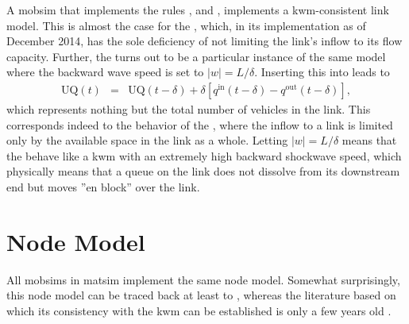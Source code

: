 A \gls{mobsim} that implements the rules , 
and ,  implements a \gls{kwm}-consistent
link model. This is almost the case for the ,
which, in its implementation as of December 2014, has the sole deficiency
of not limiting the link's inflow to its flow capacity. 
Further, the  turns out to be a
particular instance of the same model where the backward wave speed
is set to $\left|w\right|=L/\delta$. Inserting this into 
leads to
\begin{eqnarray}
\text{UQ}(t) & = & \text{UQ}(t-\delta)+\delta\left[q^{\text{in}}(t-\delta)-q^{\text{out}}(t-\delta)\right],
\end{eqnarray}
which represents nothing but the total number of vehicles in the link.
This corresponds indeed to the behavior of the ,
where the inflow to a link is limited only by the available space
in the link as a whole. Letting $\left|w\right|=L/\delta$ means that
the  behave like a \gls{kwm} with an extremely
high backward shockwave speed, which physically means that a queue
on the link does not dissolve from its downstream end but moves {}''en
block'' over the link.

\section{\label{sec:Node-model}Node Model}
All \glspl{mobsim} in \gls{matsim} implement the same node model. Somewhat surprisingly,
this node model can be traced back at least to , whereas
the literature based on which its consistency with the \gls{kwm} can be
established is only a few years old \citep{tampere-2010b,floetteroed-2011a,corthout-2012}. 

